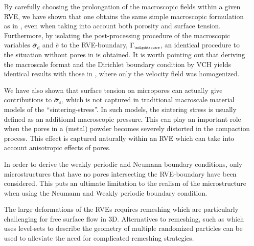 \documentclass[12pt,a4paper]{article}
\renewcommand{\ts}[1]{\mathbfit{#1}}
\renewcommand{\Box}{\mdlgwhtsquare}
\renewcommand{\dev}{\mathrm{d}}
\newcommand{\rve}{
  {\mathchoice
   {\mbox{\scalebox{0.67}{$\Box$}}}
   {\mbox{\scalebox{0.67}{$\Box$}}}
   {\mbox{\scalebox{0.5}{$\Box$}}}
   {\mbox{\scalebox{0.375}{$\Box$}}}
  }
}
\begin{document}
By carefully choosing the prolongation of the macroscopic fields within a given RVE, we have shown that one obtains the same simple macroscopic formulation as in \cite{ohman_variationally_2014}, even when taking into account both porosity and surface tension.
Furthermore, by isolating the post-processing procedure of the macroscopic variables $\bar{\ts\sigma}_\dev$ and $\bar{e}$ to the RVE-boundary, $\Gamma_\rve$, an identical procedure to the situation without pores in \cite{ohman_variationally_2014} is obtained.
It is worth pointing out that deriving the macroscale format and the Dirichlet boundary condition by VCH yields identical results with those in \cite{ohman_computational_2013}, where only the velocity field was homogenized.


We have also shown that surface tension on micropores can actually give contributions to $\bar{\ts\sigma}_\dev$, which is not captured in traditional macroscale material models of the ``sintering-stress''.
In such models, the sintering stress is usually defined as an additional macroscopic pressure.
This can play an important role when the pores in a (metal) powder becomes severely distorted in the compaction process.
This effect is captured naturally within an RVE which can take into account anisotropic effects of pores.


In order to derive the weakly periodic and Neumann boundary conditions, only microstructures that have no pores intersecting the RVE-boundary have been considered.
This puts an ultimate limitation to the realism of the microstructure when using the Neumann and Weakly periodic boundary condition.


The large deformations of the RVEs requires remeshing which are particularly challenging for free surface flow in 3D.
Alternatives to remeshing, such as \cite{pino_munoz_direct_2013} which uses level-sets to describe the geometry of multiple randomized particles can be used to alleviate the need for complicated remeshing strategies.


\printbibliography
\end{document}
